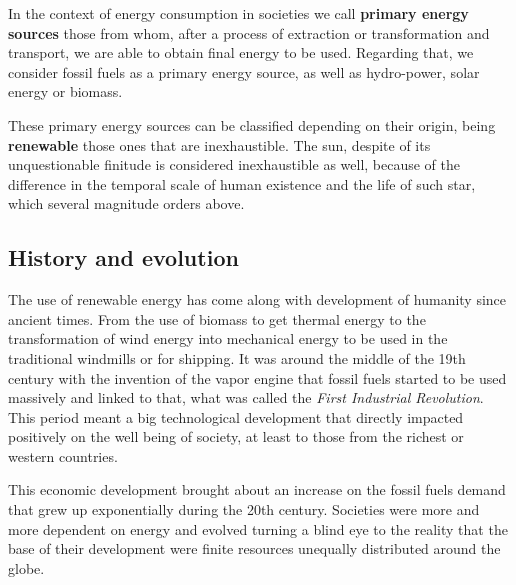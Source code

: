 

In the context of energy consumption in societies we call \textbf{primary energy sources} those from whom, after a process of extraction or transformation and transport, we are able to obtain final energy to be used. Regarding that, we consider fossil fuels as a primary energy source, as well as hydro-power, solar energy or biomass. %

These primary energy sources can be classified depending on their origin, being \textbf{renewable} those ones that are inexhaustible. The sun, despite of its unquestionable finitude is considered inexhaustible as well, because of the difference in the temporal scale of  human existence and the life of such star, which several magnitude orders above.

\subsection{History and evolution}

The use of renewable energy has come along with development of humanity since ancient times. From the use of biomass to get thermal energy to the transformation of wind energy into mechanical energy to be used in the traditional windmills or for shipping. It was around the middle of the 19th century with the invention of the vapor engine that fossil fuels started to be used massively and linked to that, what was called the \textit{First Industrial Revolution}. This period meant a big technological development that directly impacted positively on the well being of society, at least to those from the richest or western countries.
 
This economic development brought about an increase on the fossil fuels demand that grew up exponentially during the 20th century. Societies were more and more dependent on energy and evolved turning a blind eye to the reality that the base of their development were finite resources unequally distributed around the globe.

